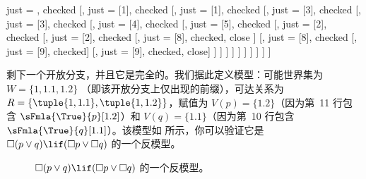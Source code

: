 \documentclass[../../../include/open-logic-section]{subfiles}
\begin{document}
{\begin{ex}
\begin{oltableau}
      just = \TAss, checked
      [,
        just = {\TRule{\False}{\lif}[1]}, checked
        [,
          just = {\TRule{\False}{\lif}[1]}, checked
          [,
            just = {\TRule{\False}{\lor}[3]}, checked
            [,
              just = {\TRule{\False}{\lor}[3]}, checked
              [,
                just = {\TRule{\False}{\Box}[4]}, checked
                [,
                  just = {\TRule{\False}{\Box}[5]}, checked
                  [,
                    just = {\TRule{\True}{\Box}[2]}, checked
                    [,
                      just = {\TRule{\True}{\Box}[2]}, checked
                      [,
                        just = {\TRule{\True}{\lor}[8]}, checked, close
                      ]
                      [,
                        just = {\TRule{\True}{\lor}[8]}, checked
                        [,
                          just = {\TRule{\True}{\lor}[9]}, checked]
                        [,
                          just = {\TRule{\True}{\lor}[9]}, checked, close]
                      ]
                    ]
                  ]
                ]
              ]
            ]
          ]
        ]
      ]
    ]
  \end{oltableau}
  剩下一个开放分支，并且它是完全的。我们据此定义模型：可能世界集为 $W = \{1, 1.1, 1.2\}$
  （即该开放分支上仅出现的前缀），可达关系为 $R = \{\tuple{1, 1.1}, \tuple{1, 1.2}\}$，赋值为 $V(p) =
  \{1.2\}$（因为第~11 行包含 $\sFmla{\True}{p}[1.2]$）和 $V(q) = \{1.1\}$（因为第~10 行包含 $\sFmla{\True}{q}[1.1]$）。该模型如  所示，你可以验证它是 $\Box(p \lor q) \lif (\Box p \lor \Box q)$ 的一个反模型。
  \begin{figure}
  \begin{center}
  \end{center}
  \caption{$\Box(p \lor q) \lif (\Box p \lor \Box
    q)$ 的一个反模型。}
\end{figure}
\end{ex}
}
\end{document}
